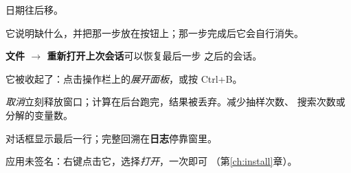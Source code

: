 \documentclass[11pt]{ctexrep}
\newcommand{\tab}[1]{\textbf{#1}}
\begin{document}
\begin{description}
        日期往后移。
  \item[通知要求先做某一步] 它说明缺什么，并把那一步放在按钮上；那一步完成后它会自行消失。
  \item[窗口在结果保存之前关闭了] \tab{文件 $\rightarrow$ 重新打开上次会话}可以恢复最后一步
        之后的会话。
  \item[参数面板不见了] 它被收起了：点击操作栏上的\emph{展开面板}，或按 Ctrl+B。
  \item[任务运行太久] \emph{取消}立刻释放窗口；计算在后台跑完，结果被丢弃。减少抽样次数、
        搜索次数或分解的变量数。
  \item[任务失败] 对话框显示最后一行；完整回溯在\tab{日志}停靠窗里。
  \item[macOS：“无法打开 Normet”] 应用未签名：右键点击它，选择\emph{打开}，一次即可
        （第\ref{ch:install}章）。
\end{description}
\end{document}
